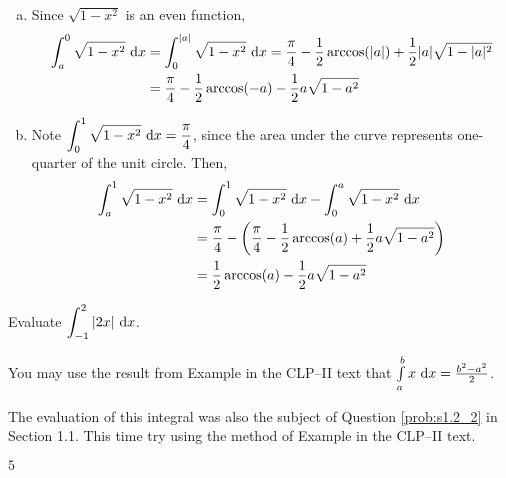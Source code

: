 \begin{solution}
\begin{enumerate}[(a)]
\item Since $\sqrt{1-x^2}$ is an even function,
\begin{align*}
\displaystyle\int_{a}^0 \sqrt{1-x^2}\ \mathrm{d}x &=\displaystyle\int_{0}^{|a|} \sqrt{1-x^2}\ \mathrm{d}x  = \frac{\pi}{4} - \frac{1}{2}\arccos(|a|)+\frac{1}{2}|a|\sqrt{1-|a|^2}\\
&=\frac{\pi}{4} - \frac{1}{2}\arccos(-a)-\frac{1}{2}a\sqrt{1-a^2}
\end{align*}
\item Note $\displaystyle\int_{0}^1 \sqrt{1-x^2}\ \mathrm{d}x=\frac{\pi}{4}$, since the area under the curve represents one-quarter of the unit circle. Then,
\begin{align*}\displaystyle\int_{a}^1 \sqrt{1-x^2}\ \mathrm{d}x&=
\displaystyle\int_{0}^1 \sqrt{1-x^2}\ \mathrm{d}x-
\displaystyle\int_{0}^a \sqrt{1-x^2}\ \mathrm{d}x\\
&=\frac{\pi}{4}-\left(\frac{\pi}{4} - \frac{1}{2}\arccos(a)+\frac{1}{2}a\sqrt{1-a^2}\right)\\
&=\frac{1}{2}\arccos(a)-\frac{1}{2}a\sqrt{1-a^2}
\end{align*}
\end{enumerate}

\end{solution}



\begin{Mquestion}[M105 2013A]\label{prob:s1.2_2}
Evaluate ${\displaystyle\int_{-1}^2 |2x|\ \dee{x}}$.

You may use the result from  Example   in the CLP--II text
that
$
\int\limits_a^b x\ \dee{x}=\frac{b^2-a^2}{2}
$.

\end{Mquestion}

\begin{hint}
The evaluation of this integral was also the subject of Question
\ref{prob:s1.2_2} in Section 1.1. This time try using the method
of Example  in the
CLP--II text.
\end{hint}

\begin{answer}
$5$
\end{answer}

